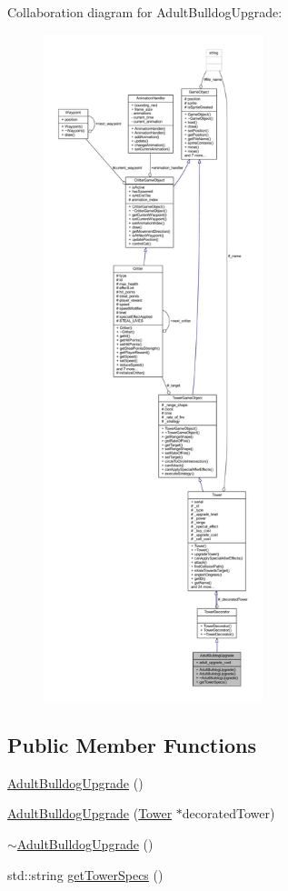Collaboration diagram for Adult\+Bulldog\+Upgrade\+:
\nopagebreak
\begin{figure}[H]
\begin{center}
\leavevmode
\includegraphics[height=550pt]{class_adult_bulldog_upgrade__coll__graph}
\end{center}
\end{figure}
\subsection*{Public Member Functions}
\begin{DoxyCompactItemize}
\item 
\hyperlink{class_adult_bulldog_upgrade_a4f70f00f82657fce52c7b013886029c7}{Adult\+Bulldog\+Upgrade} ()
\item 
\hyperlink{class_adult_bulldog_upgrade_a9152b2b5fae3cc23cab3753832b06b94}{Adult\+Bulldog\+Upgrade} (\hyperlink{class_tower}{Tower} $\ast$decorated\+Tower)
\item 
\hyperlink{class_adult_bulldog_upgrade_a5ca5b13b6b6b6f456d6d639b3dc004eb}{$\sim$\+Adult\+Bulldog\+Upgrade} ()
\item 
std\+::string \hyperlink{class_adult_bulldog_upgrade_a131cfb89f2cc408ed19be9961d0bd968}{get\+Tower\+Specs} ()
\end{DoxyCompactItemize}
